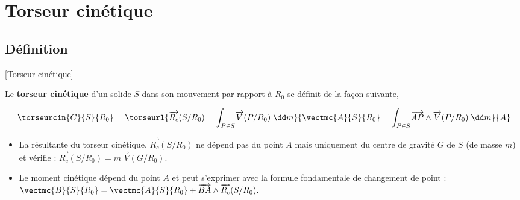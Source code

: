 \section{Torseur cinétique }

\subsection{Définition}[Torseur cinétique]
  \begin{defi}%
Le \textbf{torseur cinétique} d'un solide $S$ dans son mouvement par rapport à $R_0$ se définit de la façon suivante,

$$
\torseurcin{C}{S}{R_0}=\torseurl{\overrightarrow{R_c}(S/R_0)=\displaystyle{\int_{P\in S}}\overrightarrow{V}(P/R_0)\;\dd m}{\vectmc{A}{S}{R_0}=\displaystyle{\int_{P\in S}}\overrightarrow{AP}\wedge \overrightarrow{V}(P/R_0)\;\dd m}{A}
$$

\begin{itemize}
\item La résultante du torseur cinétique, $\overrightarrow{R_c}(S/R_0)$ ne dépend pas du point $A$ mais uniquement du centre de gravité $G$ de $S$ (de masse $m$) et vérifie :
$\overrightarrow{R_c}(S/R_0)=m\;\overrightarrow{V}(G/R_0).
$
\item Le moment cinétique dépend du point $A$ et peut s'exprimer avec la formule fondamentale de changement de point :
$
\vectmc{B}{S}{R_0}=\vectmc{A}{S}{R_0}+\overrightarrow{BA}\wedge \overrightarrow{R_c}(S/R_0).
$
\end{itemize}

\end{defi}


